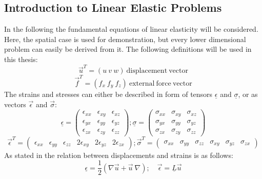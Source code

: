  \subsection{Introduction to Linear Elastic Problems}\label{sec:Shell-IntroLinEla}
 In the following the fundamental equations of linear elasticity will be considered. Here, the spatial case is used for demonstration, but every lower dimensional problem can easily be derived from it.
 The following definitions will be used in this thesis:
 \begin{equation}
 \vec{u}^T = \left(u\ v\ w\right)\ \mathrm{displacement\ vector}
 \end{equation}
 \begin{equation}
 \vec{f}^T = \left(f_x\ f_y\ f_z\right)\ \mathrm{external\ force\ vector}
 \end{equation}
 The strains and stresses can either be described in form of tensors $\underline{\epsilon}$ and $\underline{\sigma}$, or as vectors $\vec{\epsilon}$ and $\vec{\sigma}$:
 \begin{equation}
 \underline{\epsilon} = \begin{pmatrix}
 \epsilon_{xx} & \epsilon_{xy} & \epsilon_{xz} \\
 \epsilon_{yx} & \epsilon_{yy} & \epsilon_{yz} \\
 \epsilon_{zx} & \epsilon_{zy} & \epsilon_{zz} \end{pmatrix};
 \underline{\sigma} = \begin{pmatrix}
 \sigma_{xx} & \sigma_{xy} & \sigma_{xz} \\
 \sigma_{yx} & \sigma_{yy} & \sigma_{yz} \\
 \sigma_{zx} & \sigma_{zy} & \sigma_{zz} \end{pmatrix}
 \end{equation}
 \begin{equation}
 \vec{\epsilon}^T = \begin{pmatrix}
 \epsilon_{xx} & \epsilon_{yy} & \epsilon_{zz} & 2\epsilon_{xy} & 2\epsilon_{yz} & 2\epsilon_{zx} \end{pmatrix};
 \vec{\sigma}^T = \begin{pmatrix}
 \sigma_{xx} & \sigma_{yy} & \sigma_{zz} & \sigma_{xy} & \sigma_{yz} & \sigma_{zx} \end{pmatrix}
 \end{equation}
 As stated in \cite{steinke2005finite} the relation between displacements and strains is as follows:
 \begin{equation}\label{eq:displ_strain_relation}
 \underline{\epsilon} = \frac{1}{2}\left(\nabla\vec{u} + \vec{u}\:\nabla \right);\quad \vec{\epsilon}
 = \underline{L}\vec{u}
 \end{equation}
